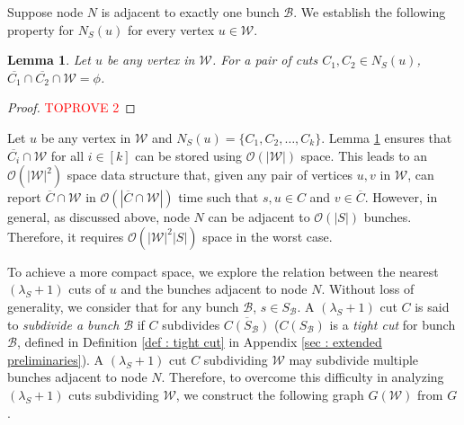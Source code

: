 \documentclass[letterpaper,11pt]{article}
\newtheorem{lemma}{Lemma}[]
\begin{document}
Suppose node $N$ is adjacent to exactly one bunch ${\mathcal B}$.
We establish the following property for $N_S(u)$ for every vertex $u\in {\mathcal W}$. \begin{lemma} \label{lem : for a single bunch data structure}
    Let $u$ be any vertex in ${\mathcal W}$. For a pair of cuts $C_1,C_2\in N_S(u)$, $\overline{C_1}\cap \overline{C_2}\cap {\mathcal W}=\phi$. 
\end{lemma}
\begin{proof}\textcolor{red}{TOPROVE 2}\end{proof}
Let $u$ be any vertex in ${\mathcal W}$ and $N_S(u)=\{C_1,C_2,\ldots,C_k\}$. Lemma \ref{lem : for a single bunch data structure} ensures that $\overline{C_i}\cap {\mathcal W}$ for all $i\in [k]$ can be stored using ${\mathcal O}(|{\mathcal W}|)$ space. This leads to an ${\mathcal O}(|{\mathcal W}|^2)$ space data structure that, given any pair of vertices $u,v$ in ${\mathcal W}$, can report $\overline{C}\cap {\mathcal W}$ in ${\mathcal O}(|\overline{C}\cap {\mathcal W}|)$ time such that $s,u\in C$ and $v\in \overline{C}$. However, in general, as discussed above, node $N$ can be adjacent to ${\mathcal O}(|S|)$ bunches. Therefore, it requires ${\mathcal O}(|{\mathcal W}|^2|S|)$ space in the worst case. 

To achieve a more compact space, we explore the relation between the nearest $(\lambda_S+1)$ cuts of $u$ and the bunches adjacent to node $N$. Without loss of generality, we consider that for any bunch ${\mathcal B}$, $s\in S_{\mathcal B}$. A $(\lambda_S+1)$ cut $C$ is said to \textit{subdivide a bunch} ${\mathcal B}$ if $C$ subdivides $\overline{C(S_{\mathcal B})}$ ($C(S_{\mathcal B})$ is a \textit{tight cut} for bunch ${\mathcal B}$, defined in Definition \ref{def : tight cut} in Appendix \ref{sec : extended preliminaries}).  A $(\lambda_S+1)$ cut $C$ subdividing ${\mathcal W}$ may subdivide multiple bunches adjacent to node $N$. 
Therefore, to overcome this difficulty in analyzing $(\lambda_S+1)$ cuts subdividing ${\mathcal W}$, we construct the following graph $G({\mathcal W})$ from $G$. \\
\end{document}
